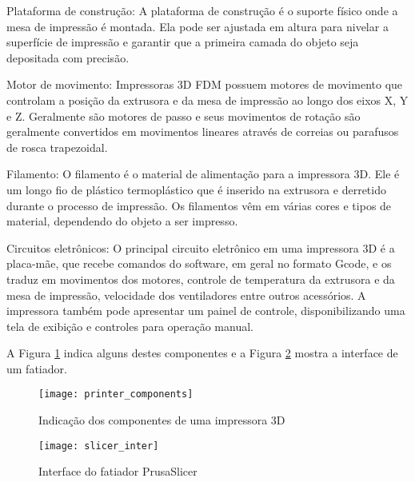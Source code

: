 Plataforma de construção: A plataforma de construção é o suporte físico onde a mesa de impressão é montada. Ela pode ser ajustada em altura para nivelar a superfície de impressão e garantir que a primeira camada do objeto seja depositada com precisão.

Motor de movimento: Impressoras 3D FDM possuem motores de movimento que controlam a posição da extrusora e da mesa de impressão ao longo dos eixos X, Y e Z. Geralmente são motores de passo e seus movimentos de rotação são geralmente convertidos em movimentos lineares através de correias ou parafusos de rosca trapezoidal.

Filamento: O filamento é o material de alimentação para a impressora 3D. Ele é um longo fio de plástico termoplástico que é inserido na extrusora e derretido durante o processo de impressão. Os filamentos vêm em várias cores e tipos de material, dependendo do objeto a ser impresso.

Circuitos eletrônicos: O principal circuito eletrônico em uma impressora 3D é a placa-mãe, que recebe comandos do software, em geral no formato Gcode, e os traduz em movimentos dos motores, controle de temperatura da extrusora e da mesa de impressão, velocidade dos ventiladores entre outros acessórios. A impressora também pode apresentar um painel de controle, disponibilizando uma tela de exibição e controles para operação manual.

A Figura \ref{fig:impressora3d_comp} indica alguns destes componentes e a Figura \ref{fig:slicer_inter} mostra a interface de um fatiador.

\begin{figure}[H]
    \centering
    \caption{Indicação dos componentes de uma impressora 3D}
    \texttt{[image: printer\_components]}
    \label{fig:impressora3d_comp}
\end{figure}

\begin{figure}[H]
    \centering
    \caption{Interface do fatiador PrusaSlicer}
    \texttt{[image: slicer\_inter]}
    \label{fig:slicer_inter}
\end{figure}

